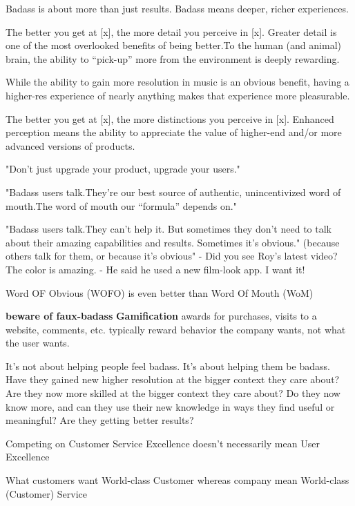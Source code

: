 Badass is about more than just results. Badass means deeper, richer experiences.

The better you get at [x], the more detail you perceive in [x]. Greater detail is one of the most overlooked benefits of being better.To the human (and animal) brain, the ability to “pick-up” more from the environment is deeply rewarding.

While the ability to gain more resolution in music is an obvious benefit, having a higher-res experience of nearly anything makes that experience more pleasurable.

The better you get at [x], the more distinctions you perceive in [x]. Enhanced perception means the ability to appreciate the value of higher-end and/or more advanced versions of products. %

"Don’t just upgrade your product, upgrade your users."

"Badass users talk.They’re our best source of authentic, unincentivized word of mouth.The word of mouth our “formula” depends on."

"Badass users talk.They can’t help it.
But sometimes they don’t need to talk about their amazing capabilities and results.
Sometimes it’s obvious." (because others talk for them, or because it's obvious"
- Did you see Roy’s latest video? The color is amazing.
- He said he used a new film-look app. I want it!

Word OF Obvious (WOFO) is even better than Word Of Mouth (WoM)

\textbf{ beware of faux-badass}
\textbf{Gamification} awards for purchases, visits to a website, comments, etc. typically reward behavior the company wants, not what the user wants.

It’s not about helping people feel badass. It’s about helping them be badass.
Have they gained new higher resolution at the bigger context they care about?
Are they now more skilled at the bigger context they care about?
Do they now know more, and can they use their new knowledge in ways they find useful or meaningful?
Are they getting better results?

Competing on Customer Service Excellence doesn’t necessarily mean User Excellence

What customers want
World-class Customer
whereas company mean World-class (Customer) Service


